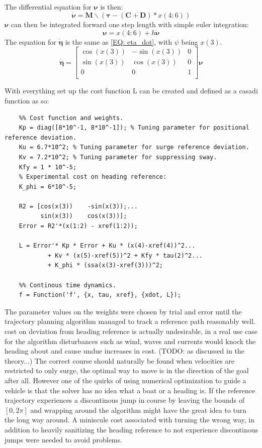 The differential equation for $\bm{\nu}$ is then:
\begin{equation}
    \dot{\bm{\nu}} = \textbf{M}\backslash(\bm{\tau} - (\textbf{C}+\textbf{D})*x(4:6))
\end{equation}
$\bm{\nu}$ can then be integrated forward one step length with simple euler integration:
\begin{equation}
    \bm{\nu} = x(4:6) + h\dot{\bm{\nu}}
\end{equation}
The equation for $\dot{\bm{\eta}}$ is the same as \eqref{EQ: eta_dot}, with $\psi$ being $x(3)$.
\begin{equation}
    \dot{\bm{\eta}} = \begin{bmatrix}
        \cos(x(3)) & -\sin(x(3)) & 0\\
        \sin(x(3)) & \cos(x(3)) & 0\\
        0 & 0 & 1 \\
    \end{bmatrix} \bm{\nu}
\end{equation}

With everything set up the cost function L can be created and defined as a casadi function as so:
\begin{lstlisting}
    %% Cost function and weights.
    Kp = diag([8*10^-1, 8*10^-1]); % Tuning parameter for positional reference deviation.
    Ku = 6.7*10^2; % Tuning parameter for surge reference deviation.
    Kv = 7.2*10^2; % Tuning parameter for suppressing sway.
    Kfy = 1 * 10^-5;
    % Experimental cost on heading reference:
    K_phi = 6*10^-5;

    R2 = [cos(x(3))    -sin(x(3));...
          sin(x(3))    cos(x(3))];
    Error = R2'*(x(1:2) - xref(1:2));

    L = Error'* Kp * Error + Ku * (x(4)-xref(4))^2...
            + Kv * (x(5)-xref(5))^2 + Kfy * tau(2)^2...
            + K_phi * (ssa(x(3)-xref(3)))^2;
    
    %% Continous time dynamics.
    f = Function('f', {x, tau, xref}, {xdot, L});    
\end{lstlisting}

The parameter values on the weights were chosen by trial and error until the trajectory planning algorithm managed
to track a reference path reasonably well. cost on deviation from heading reference is actually undesirable, in a real use case
for the algorithm disturbances such as wind, waves and currents would knock the heading about and cause undue increases in cost.
(TODO: as discussed in the theory...) The correct course should naturally be found when velocities are restricted to only
surge, the optimal way to move is in the direction of the goal after all. However one of the quirks of using numerical optimization 
to guide a vehicle is that the solver has no idea what a boat or a heading is. If the reference trajectory experiences a discontinous
jump in course by leaving the bounds of $[0, 2\pi]$ and wrapping around the algorithm might have the great idea to turn the long way around.
A miniscule cost associated with turning the wrong way, in addition to heavily sanitizing the heading reference to not experience discontinous jumps
were needed to avoid problems.

